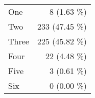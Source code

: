 \begin{tabular}{ l  r }
One & 8 (1.63 \%)\\
Two & 233 (47.45 \%)\\
Three & 225 (45.82 \%)\\
Four & 22 (4.48 \%)\\
Five & 3 (0.61 \%)\\
Six & 0 (0.00 \%)\\
\end{tabular}